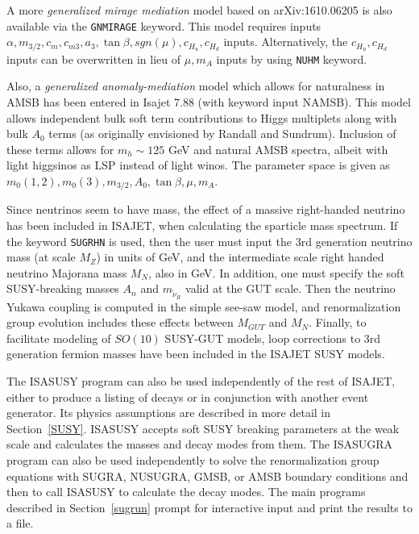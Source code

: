 A more {\it generalized mirage mediation} model based on arXiv:1610.06205
is also available via the \verb|GNMIRAGE| keyword. This model requires
inputs $\alpha ,m_{3/2},c_m,c_{m3},a_3,\tan\beta ,sgn( \mu ),c_{H_u},c_{H_d}$ 
inputs. Alternatively, the $c_{H_u},c_{H_d}$ inputs can be overwritten 
in lieu of $\mu ,m_A$ inputs by using \verb|NUHM| keyword.

Also, a {\it generalized anomaly-mediation} model which allows for
naturalness in AMSB has been entered in Isajet 7.88 (with keyword
input NAMSB). 
This model allows independent bulk soft term contributions to Higgs multiplets
along with bulk $A_0$ terms (as originally envisioned by 
Randall and Sundrum). Inclusion of these terms allows for $m_h\sim 125$ GeV and
natural AMSB spectra, albeit with light higgsinos as LSP instead of light winos.
The parameter space is given as $m_0(1,2),m_0(3),m_{3/2},A_0,\tan\beta ,\mu, m_A$.

\medskip

     Since neutrinos seem to have mass, the effect of a massive
right-handed neutrino has been included in ISAJET, when calculating the
sparticle mass spectrum. If the keyword \verb|SUGRHN| is used, then the
user must input the 3rd generation neutrino mass (at scale $M_Z$) in
units of GeV, and the intermediate scale right handed neutrino Majorana
mass $M_N$, also in GeV. In addition, one must specify the soft
SUSY-breaking masses $A_n$ and $m_{\tilde\nu_R}$ valid at the GUT scale.
Then the neutrino Yukawa coupling is computed in the simple see-saw
model, and renormalization group evolution includes these effects
between $M_{GUT}$ and $M_N$. Finally, to facilitate modeling of $SO(10)$
SUSY-GUT models, loop corrections to 3rd generation fermion masses have
been included in the ISAJET SUSY models.

\bigskip\bigskip

      The ISASUSY program can also be used independently of the rest of
ISAJET, either to produce a listing of decays or in conjunction with
another event generator. Its physics assumptions are described in more
detail in Section~\ref{SUSY}. ISASUSY accepts soft SUSY breaking
parameters at the weak scale and calculates the masses and decay modes
from them. The ISASUGRA program can also be used independently to solve
the renormalization group equations with SUGRA, NUSUGRA, GMSB, or AMSB
boundary conditions and then to call ISASUSY to calculate the decay
modes. The main programs described in Section~\ref{sugrun} prompt for
interactive input and print the results to a file.

